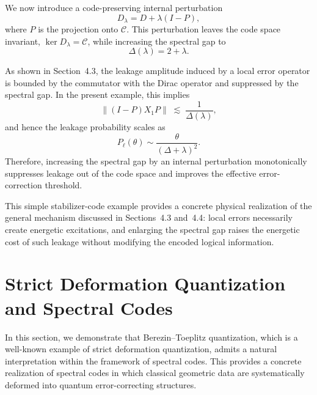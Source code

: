 \documentclass[12pt]{article}
\theoremstyle{definition} %
\theoremstyle{plain} %
\theoremstyle{remark} %
\theoremstyle{underline}
\begin{document}
We now introduce a code-preserving internal perturbation
\begin{equation}
    D_\lambda = D + \lambda (I - P),
\end{equation}
where $P$ is the projection onto $\mathcal C$.
This perturbation leaves the code space invariant, $\ker D_\lambda = \mathcal C$, while increasing the spectral gap to
\begin{equation}
    \Delta(\lambda) = 2 + \lambda .
\end{equation}

As shown in Section~4.3, the leakage amplitude induced by a local error operator is bounded by the commutator with the Dirac operator and suppressed by the spectral gap.
In the present example, this implies
\begin{equation}
    \|(I-P) X_1 P\| \;\lesssim\; \frac{1}{\Delta(\lambda)},
\end{equation}
and hence the leakage probability scales as
\begin{equation}
    P_\ell(\theta) \sim \frac{\theta}{(\Delta+\lambda)^2}.
\end{equation}
Therefore, increasing the spectral gap by an internal perturbation monotonically suppresses leakage out of the code space and improves the effective error-correction threshold.

This simple stabilizer-code example provides a concrete physical realization of the general mechanism discussed in Sections~4.3 and~4.4: local errors necessarily create energetic excitations, and enlarging the spectral gap raises the energetic cost of such leakage without modifying the encoded logical information.

\section{Strict Deformation Quantization and Spectral Codes}

In this section, we demonstrate that Berezin--Toeplitz quantization, which is a well-known example of strict deformation quantization, admits a natural interpretation within the framework of spectral codes.
This provides a concrete realization of spectral codes in which classical geometric data are systematically deformed into quantum error-correcting structures.
\end{document}
